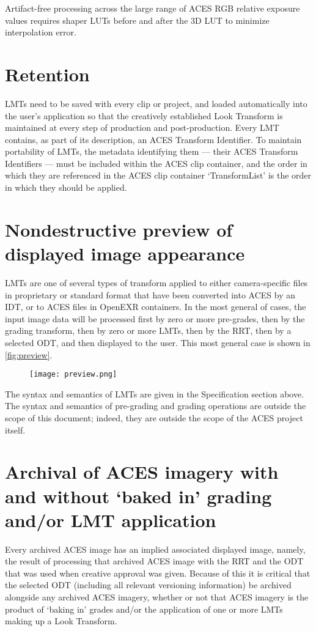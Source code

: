 Artifact-free processing across the large range of ACES RGB relative exposure values requires shaper LUTs before and after the 3D LUT to minimize interpolation error.

\section{Retention}
LMTs need to be saved with every clip or project, and loaded automatically into the user's application so that the creatively established Look Transform is maintained at every step of production and post-production. Every LMT contains, as part of its description, an ACES Transform Identifier. To maintain portability of LMTs, the metadata identifying them — their ACES Transform Identifiers — must be included within the ACES clip container, and the order in which they are referenced in the ACES clip container `TransformList' is the order in which they should be applied.

\section{Nondestructive preview of displayed image appearance}
LMTs are one of several types of transform applied to either camera-specific files in proprietary or standard format that have been converted into ACES by an IDT, or to ACES files in OpenEXR containers. In the most general of cases, the input image data will be processed first by zero or more pre-grades, then by the grading transform, then by zero or more LMTs, then by the RRT, then by a selected ODT, and then displayed to the user. This most general case is shown in \autoref{fig:preview}.

\begin{figure}[htb]
\begin{center}
    \texttt{[image: preview.png]}
\caption{}
\label{fig:preview}
\end{center}
\end{figure}

The syntax and semantics of LMTs are given in the Specification section above. The syntax and semantics of pre-grading and grading operations are outside the scope of this document; indeed, they are outside the scope of the ACES project itself.

\section{Archival of ACES imagery with and without ‘baked in’ grading and/or LMT application}
Every archived ACES image has an implied associated displayed image, namely, the result of processing that archived ACES image with the RRT and the ODT that was used when creative approval was given. Because of this it is critical that the selected ODT (including all relevant versioning information) be archived alongside any archived ACES imagery, whether or not that ACES imagery is the product of `baking in' grades and/or the application of one or more LMTs making up a Look Transform.

